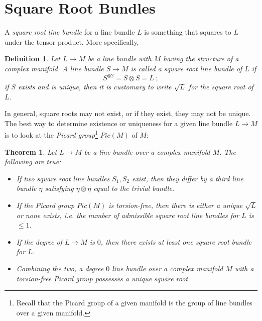 \documentclass{tufte-handout}
\newtheorem{thrm}{Theorem} %
\newtheorem{defn}{Definition} %
\begin{document}
\section{Square Root Bundles}
A \emph{square root line bundle} for a line bundle $L$ is something that squares to $L$ under the tensor product. More specifically,
\begin{fullwidth}
\begin{defn}
Let $L \to M$ be a line bundle with $M$ having the structure of a complex manifold. A line bundle $S \to M$ is called a \emph{square root} line bundle of $L$ if
$$
S^{\otimes 2} = S \otimes S = L \; ;
$$
if $S$ exists and is unique, then it is customary to write $\sqrt{L}$ for the square root of $L$.
\end{defn}
\end{fullwidth}

In general, square roots may not exist, or if they exist, they may not be unique. The best way to determine existence or uniqueness for a given line bundle $L \to M$ is to look at the \emph{Picard group}\footnote{Recall that the Picard group of a given manifold is the group of line bundles over a given manifold.} $Pic(M)$ of $M$:

\begin{thrm}
Let $L \to M$ be a line bundle over a complex manifold $M$. The following are true:
\begin{itemize}
\item If two square root line bundles $S_1, S_2$ exist, then they differ by a third line bundle $\eta$ satisfying $\eta \otimes \eta$ equal to the trivial bundle.

\item If the Picard group $Pic(M)$ is \emph{torsion-free}, then there is either a unique $\sqrt{L}$ or none exists, i.e. the number of admissible square root line bundles for $L$ is $\leq 1$.

\item If the degree of $L \to M$ is $0$, then there exists at least one square root bundle for $L$.

\item Combining the two, a degree $0$ line bundle over a complex manifold $M$ with a torsion-free Picard group possesses a unique square root.
\end{itemize}
\end{thrm}

\end{document}
